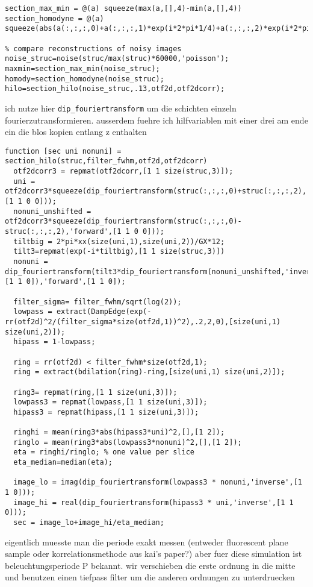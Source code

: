 \begin{lstlisting}[style=mymatlab]
section_max_min = @(a) squeeze(max(a,[],4)-min(a,[],4))
section_homodyne = @(a) squeeze(abs(a(:,:,:,0)+a(:,:,:,1)*exp(i*2*pi*1/4)+a(:,:,:,2)*exp(i*2*pi*2/4)+a(:,:,:,3)*exp(i*2*pi*3/4)))

% compare reconstructions of noisy images
noise_struc=noise(struc/max(struc)*60000,'poisson');
maxmin=section_max_min(noise_struc);
homody=section_homodyne(noise_struc);
hilo=section_hilo(noise_struc,.13,otf2d,otf2dcorr);
\end{lstlisting}

ich nutze hier \verb!dip_fouriertransform! um die schichten einzeln
fourierzutransformieren. ausserdem fuehre ich hilfvariablen mit einer
drei am ende ein die blos kopien entlang z enthalten
\begin{lstlisting}[style=mymatlab]
function [sec uni nonuni] = section_hilo(struc,filter_fwhm,otf2d,otf2dcorr)
  otf2dcorr3 = repmat(otf2dcorr,[1 1 size(struc,3)]);
  uni = otf2dcorr3*squeeze(dip_fouriertransform(struc(:,:,:,0)+struc(:,:,:,2),'forward',[1 1 0 0]));
  nonuni_unshifted = otf2dcorr3*squeeze(dip_fouriertransform(struc(:,:,:,0)-struc(:,:,:,2),'forward',[1 1 0 0]));
  tiltbig = 2*pi*xx(size(uni,1),size(uni,2))/GX*12;
  tilt3=repmat(exp(-i*tiltbig),[1 1 size(struc,3)])
  nonuni = dip_fouriertransform(tilt3*dip_fouriertransform(nonuni_unshifted,'inverse',[1 1 0]),'forward',[1 1 0]);

  filter_sigma= filter_fwhm/sqrt(log(2));
  lowpass = extract(DampEdge(exp(-rr(otf2d)^2/(filter_sigma*size(otf2d,1))^2),.2,2,0),[size(uni,1) size(uni,2)]);
  hipass = 1-lowpass;

  ring = rr(otf2d) < filter_fwhm*size(otf2d,1);
  ring = extract(bdilation(ring)-ring,[size(uni,1) size(uni,2)]);

  ring3= repmat(ring,[1 1 size(uni,3)]);
  lowpass3 = repmat(lowpass,[1 1 size(uni,3)]);
  hipass3 = repmat(hipass,[1 1 size(uni,3)]);

  ringhi = mean(ring3*abs(hipass3*uni)^2,[],[1 2]);
  ringlo = mean(ring3*abs(lowpass3*nonuni)^2,[],[1 2]);
  eta = ringhi/ringlo; % one value per slice
  eta_median=median(eta);
      
  image_lo = imag(dip_fouriertransform(lowpass3 * nonuni,'inverse',[1 1 0]));
  image_hi = real(dip_fouriertransform(hipass3 * uni,'inverse',[1 1 0]));
  sec = image_lo+image_hi/eta_median;
\end{lstlisting}



eigentlich muesste man die periode exakt messen (entweder
fluorescent plane sample oder korrelationsmethode aus kai's paper?)
aber fuer diese simulation ist beleuchtungsperiode P bekannt. wir
verschieben die erste ordnung in die mitte und benutzen einen
tiefpass filter um die anderen ordnungen zu unterdruecken

